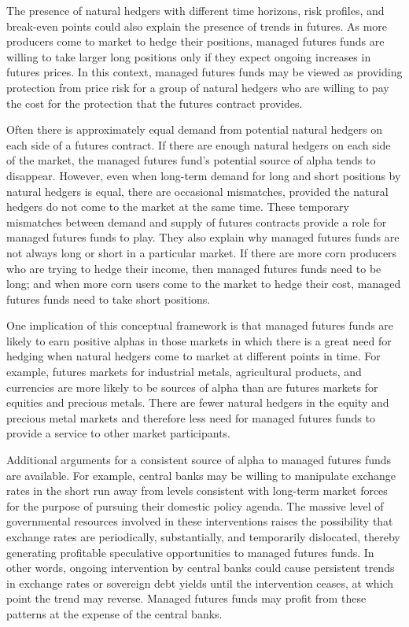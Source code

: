 \documentclass[11pt]{article}
\begin{document}
The presence of natural hedgers with different time horizons, risk profiles, and break-even points could also explain the presence of trends in futures. As more producers come to market to hedge their positions, managed futures funds are willing to take larger long positions only if they expect ongoing increases in futures prices. In this context, managed futures funds may be viewed as providing protection from price risk for a group of natural hedgers who are willing to pay the cost for the protection that the futures contract provides.

Often there is approximately equal demand from potential natural hedgers on each side of a futures contract. If there are enough natural hedgers on each side of the market, the managed futures fund's potential source of alpha tends to disappear. However, even when long-term demand for long and short positions by natural hedgers is equal, there are occasional mismatches, provided the natural hedgers do not come to the market at the same time. These temporary mismatches between demand and supply of futures contracts provide a role for managed futures funds to play. They also explain why managed futures funds are not always long or short in a particular market. If there are more corn producers who are trying to hedge their income, then managed futures funds need to be long; and when more corn users come to the market to hedge their cost, managed futures funds need to take short positions.

One implication of this conceptual framework is that managed futures funds are likely to earn positive alphas in those markets in which there is a great need for hedging when natural hedgers come to market at different points in time. For example, futures markets for industrial metals, agricultural products, and currencies are more likely to be sources of alpha than are futures markets for equities and precious metals. There are fewer natural hedgers in the equity and precious metal markets and therefore less need for managed futures funds to provide a service to other market participants.

Additional arguments for a consistent source of alpha to managed futures funds are available. For example, central banks may be willing to manipulate exchange rates in the short run away from levels consistent with long-term market forces for the purpose of pursuing their domestic policy agenda. The massive level of governmental resources involved in these interventions raises the possibility that exchange rates are periodically, substantially, and temporarily dislocated, thereby generating profitable speculative opportunities to managed futures funds. In other words, ongoing intervention by central banks could cause persistent trends in exchange rates or sovereign debt yields until the intervention ceases, at which point the trend may reverse. Managed futures funds may profit from these patterns at the expense of the central banks.
\end{document}
